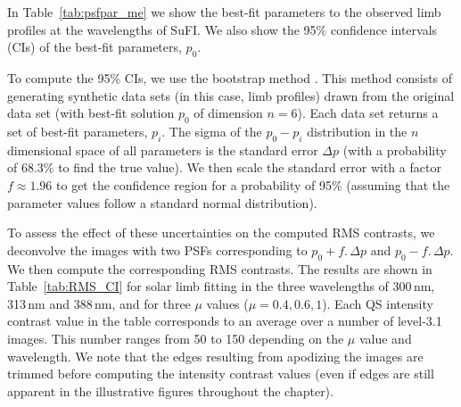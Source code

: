 \documentclass[goettingen, gauss, print]{thesis}
\begin{document}
In Table~\ref{tab:psfpar_me} we show the best-fit parameters to the observed limb profiles at the wavelengths of SuFI. We also show the 95\% confidence intervals (CIs) of the best-fit parameters, $p_0$.

To compute the 95\% CIs, we use the bootstrap method \citep{press_numerical_1992}. This method consists of generating synthetic data sets (in this case, limb profiles) drawn from the original data set (with best-fit solution $p_0$ of dimension $n=6$). Each data set returns a set of best-fit parameters, $p_i$. The sigma of the $p_0-p_i$ distribution in the $n$ dimensional space of all parameters is the standard error $\Delta p$ (with a probability of 68.3\% to find the true value). We then scale the standard error with a factor $f\approx1.96$ to get the confidence region for a probability of 95\% (assuming that the parameter values follow a standard normal distribution).

To assess the effect of these uncertainties on the computed RMS contrasts, we deconvolve the images with two PSFs corresponding to $p_0+f.\,\Delta p$ and $p_0-f.\,\Delta p$. We then compute the corresponding RMS contrasts. The results are shown in Table~\ref{tab:RMS_CI} for solar limb fitting in the three wavelengths of 300\,nm, 313\,nm and 388\,nm, and for three $\mu$ values ($\mu = 0.4, 0.6, 1$). Each QS intensity contrast value in the table corresponds to an average over a number of level-3.1 images. This number ranges from 50 to 150 depending on the $\mu$ value and wavelength. We note that the edges resulting from apodizing the images are trimmed before computing the intensity contrast values (even if edges are still apparent in the illustrative figures throughout the chapter).
\end{document}
